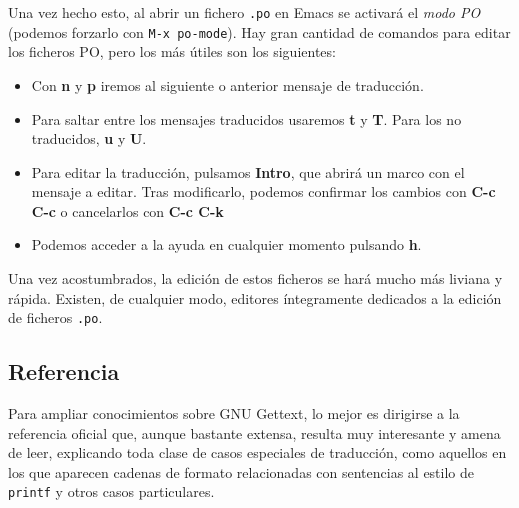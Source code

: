 Una vez hecho esto, al abrir un fichero \texttt{.po} en Emacs se activará el
\textit{modo PO} (podemos forzarlo con \texttt{M-x po-mode}). Hay gran cantidad
de comandos para editar los ficheros PO, pero los más útiles son los siguientes:

\begin{itemize}
\item Con \textbf{n} y \textbf{p} iremos al siguiente o anterior mensaje de
  traducción.
\item Para saltar entre los mensajes traducidos usaremos \textbf{t} y
  \textbf{T}. Para los no traducidos, \textbf{u} y \textbf{U}.
\item Para editar la traducción, pulsamos \textbf{Intro}, que abrirá un marco
  con el mensaje a editar. Tras modificarlo, podemos confirmar los cambios con
  \textbf{C-c C-c} o cancelarlos con \textbf{C-c C-k}
\item Podemos acceder a la ayuda en cualquier momento pulsando \textbf{h}.
\end{itemize}

Una vez acostumbrados, la edición de estos ficheros se hará mucho más liviana y
rápida. Existen, de cualquier modo, editores íntegramente dedicados a la edición
de ficheros \texttt{.po}.

\subsection{Referencia}
Para ampliar conocimientos sobre GNU Gettext, lo mejor es dirigirse a la
referencia oficial \cite{refrefgettext} que, aunque bastante extensa, resulta
muy interesante y amena de leer, explicando toda clase de casos especiales de
traducción, como aquellos en los que aparecen cadenas de formato relacionadas
con sentencias al estilo de \texttt{printf} y otros casos particulares.


